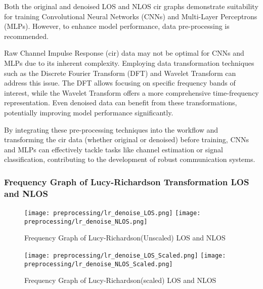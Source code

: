 Both the original and denoised LOS and NLOS \acrshort{cir} graphs demonstrate suitability for training Convolutional Neural Networks (CNNs) and Multi-Layer Perceptrons (MLPs). However, to enhance model performance, data pre-processing is recommended. 

Raw Channel Impulse Response (\acrshort{cir}) data may not be optimal for CNNs and MLPs due to its inherent complexity. Employing data transformation techniques such as the Discrete Fourier Transform (DFT) and Wavelet Transform can address this issue. The DFT allows focusing on specific frequency bands of interest, while the Wavelet Transform offers a more comprehensive time-frequency representation. Even denoised data can benefit from these transformations, potentially improving model performance significantly.

By integrating these pre-processing techniques into the workflow and transforming the \acrshort{cir} data (whether original or denoised) before training, CNNs and MLPs can effectively tackle tasks like channel estimation or signal classification, contributing to the development of robust communication systems.

\subsubsection{Frequency Graph of Lucy-Richardson Transformation LOS and NLOS}\label{frequency_graph_lr}

\begin{figure}[H] 
  \centering
  \texttt{[image: preprocessing/lr\_denoise\_LOS.png]}
  \texttt{[image: preprocessing/lr\_denoise\_NLOS.png]}
  \caption{Frequency Graph of Lucy-Richardson(Unscaled) LOS and NLOS}\label{fig:frequency_graph_lr}
\end{figure}

\begin{figure}[H] 
  \centering
  \texttt{[image: preprocessing/lr\_denoise\_LOS\_Scaled.png]}
  \texttt{[image: preprocessing/lr\_denoise\_NLOS\_Scaled.png]}
  \caption{Frequency Graph of Lucy-Richardson(scaled) LOS and NLOS}\label{fig:frequency_graph_lr_scaled}
\end{figure}


